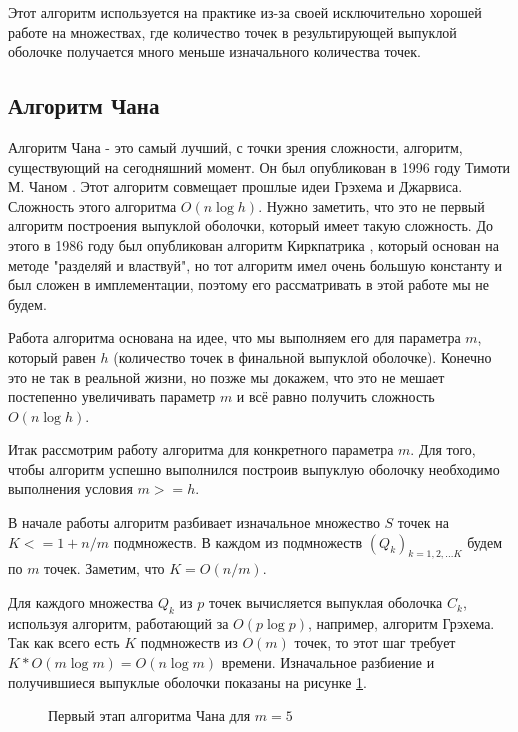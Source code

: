 Этот алгоритм используется на практике из-за своей исключительно хорошей работе на множествах, где количество точек в результирующей выпуклой оболочке получается много меньше изначального количества точек.

\subsection{Алгоритм Чана} \label{subsect1_1_6}

Алгоритм Чана - это самый лучший, с точки зрения сложности, алгоритм, существующий на сегодняшний момент. Он был опубликован в 1996 году Тимоти М. Чаном \cite{chan1996Chan}. Этот алгоритм совмещает прошлые идеи Грэхема и Джарвиса. Сложность этого алгоритма $O(n \log h)$. Нужно заметить, что это не первый алгоритм построения выпуклой оболочки, который имеет такую сложность. До этого в 1986 году был опубликован алгоритм Киркпатрика \cite{kirkpatrick1986ultimate}, который основан на методе "разделяй и властвуй", но тот алгоритм имел очень большую константу и был сложен в имплементации, поэтому его рассматривать в этой работе мы не будем.

Работа алгоритма основана на идее, что мы выполняем его для параметра $m$, который равен $h$ (количество точек в финальной выпуклой оболочке). Конечно это не так в реальной жизни, но позже мы докажем, что это не мешает постепенно увеличивать параметр $m$ и всё равно получить сложность $O(n \log h)$.

Итак рассмотрим работу алгоритма для конкретного параметра $m$. Для того, чтобы алгоритм успешно выполнился построив выпуклую оболочку необходимо выполнения условия $m >= h$.

В начале работы алгоритм разбивает изначальное множество $S$ точек на $K <= 1 + n / m$ подмножеств. В каждом из подмножеств $(Q_k)_{k=1,2,...K}$ будем по $m$ точек. Заметим, что $K = O(n / m)$.

Для каждого множества $Q_k$ из $p$ точек вычисляется выпуклая оболочка $C_k$, используя алгоритм, работающий за $O(p \log p)$, например, алгоритм Грэхема. Так как всего есть $K$ подмножеств из $O(m)$ точек, то этот шаг требует $K * O(m \log m) = O(n \log m)$ времени. Изначальное разбиение и получившиеся выпуклые оболочки показаны на рисунке \ref{img:chan_1}.

\begin{figure}[H]
	{\centering
		\hfill
		\hfill
		\hfill
	}
	\caption{Первый этап алгоритма Чана для $m = 5$}
	\label{img:chan_1}
\end{figure}


